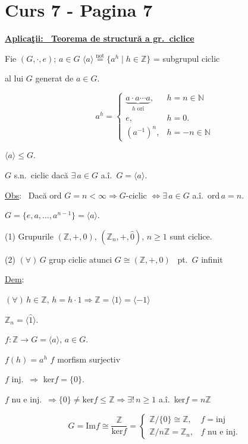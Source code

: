 \section*{Curs 7 - Pagina 7}

\noindent\underline{\textbf{Aplicaţii: \ Teorema de structură a gr.\ ciclice}}

\bigskip
\noindent Fie $(G,\cdot,e)$; $a\in G$ \quad $\langle a\rangle \overset{\text{not}}{=} \{a^h \mid h\in\mathbb{Z}\}$ = subgrupul ciclic

\noindent al lui $G$ generat de $a\in G$.

\[
a^h =
\begin{cases}
\underbrace{a\cdot a\cdots a}_{h \text{ ori}}, & h=n\in\mathbb{N} \\
e, & h=0. \\
(a^{-1})^n, & h=-n\in\mathbb{N}
\end{cases}
\]

\noindent $\langle a\rangle \leq G$.

\bigskip
\noindent $G$ s.n.\ ciclic dacă $\exists\,a\in G$ a.î.\ $G=\langle a\rangle$.

\bigskip
\noindent\underline{Obs}: \ Dacă ord $G=n<\infty \Rightarrow G$-ciclic $\Leftrightarrow \exists\,a\in G$ a.î.\ ord$\,a=n$.

\noindent $G=\{e,a,\ldots,a^{n-1}\} = \langle a\rangle$.

\bigskip
\noindent (1) Grupurile $(\mathbb{Z},+,0)$, $(\mathbb{Z}_n,+,\hat 0)$, $n\geq 1$ sunt ciclice.

\noindent (2) $(\forall)\,G$ grup ciclic atunci $G\cong (\mathbb{Z},+,0)$ \ pt.\ $G$ infinit

\bigskip
\noindent\underline{Dem}:

\noindent $(\forall)\,h\in\mathbb{Z}$, $h=h\cdot 1 \Rightarrow \mathbb{Z} = \langle 1\rangle = \langle -1\rangle$

\noindent $\mathbb{Z}_n = \langle\hat 1\rangle$.

\bigskip
\noindent $f: \mathbb{Z}\to G=\langle a\rangle$, $a\in G$.

\noindent $f(h)=a^h$ \quad $f$ morfism surjectiv

\bigskip
\noindent $f$ inj.\ $\Rightarrow$ ker$f=\{0\}$.

\noindent $f$ nu e inj.\ $\Rightarrow \{0\}\neq\text{ker}f\leq\mathbb{Z} \Rightarrow \exists!\,n\geq 1$ a.î.\ ker$f=n\mathbb{Z}$

\[
G=\text{Im}f \cong \frac{\mathbb{Z}}{\text{ker}f} =
\begin{cases}
\mathbb{Z}/\{0\} \cong \mathbb{Z}, & f=\text{inj}\\
\mathbb{Z}/n\mathbb{Z} = \mathbb{Z}_n, & f\text{ nu e inj.}
\end{cases}
\]

